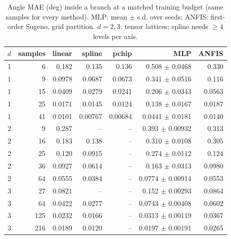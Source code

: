 \begin{table}[!t]
\centering
\caption{Angle MAE (deg) inside a branch at a matched training budget (same samples for every method). MLP: mean $\pm$ s.d. over seeds; ANFIS: first-order Sugeno, grid partition. $d = 2, 3$: tensor lattices; spline needs $\ge 4$ levels per axis.}
\label{tab:regression}
\footnotesize
\setlength{\tabcolsep}{4pt}
\begin{tabular}{rrrrrrr}
\toprule
$d$ & samples & linear & spline & pchip & MLP & ANFIS \\
\midrule
1 & 6 & 0.182 & 0.135 & 0.136 & 0.508 $\pm$ 0.0468 & 0.330 \\
1 & 9 & 0.0978 & 0.0687 & 0.0673 & 0.341 $\pm$ 0.0516 & 0.116 \\
1 & 15 & 0.0409 & 0.0279 & 0.0241 & 0.206 $\pm$ 0.0343 & 0.0563 \\
1 & 25 & 0.0171 & 0.0145 & 0.0124 & 0.138 $\pm$ 0.0167 & 0.0187 \\
1 & 41 & 0.0101 & 0.00767 & 0.00684 & 0.0441 $\pm$ 0.0181 & 0.0140 \\
2 & 9 & 0.287 & -- & -- & 0.393 $\pm$ 0.00932 & 0.313 \\
2 & 16 & 0.183 & 0.138 & -- & 0.310 $\pm$ 0.0108 & 0.305 \\
2 & 25 & 0.120 & 0.0915 & -- & 0.274 $\pm$ 0.0112 & 0.124 \\
2 & 36 & 0.0927 & 0.0614 & -- & 0.163 $\pm$ 0.0313 & 0.0980 \\
2 & 64 & 0.0555 & 0.0384 & -- & 0.0774 $\pm$ 0.00914 & 0.0553 \\
3 & 27 & 0.0821 & -- & -- & 0.152 $\pm$ 0.00293 & 0.0864 \\
3 & 64 & 0.0422 & 0.0277 & -- & 0.0743 $\pm$ 0.00408 & 0.0602 \\
3 & 125 & 0.0232 & 0.0166 & -- & 0.0313 $\pm$ 0.00119 & 0.0367 \\
3 & 216 & 0.0189 & 0.0120 & -- & 0.0197 $\pm$ 0.00191 & 0.0265 \\
\bottomrule
\end{tabular}
\end{table}
